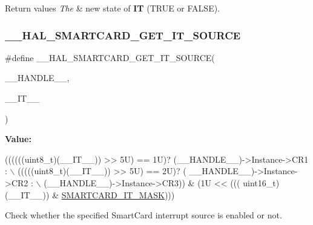 \begin{DoxyRetVals}{Return values}
{\em The} & new state of {\bfseries IT} (T\+R\+UE or F\+A\+L\+SE). \\
\hline
\end{DoxyRetVals}
\mbox{\label{group___s_m_a_r_t_c_a_r_d___exported___macros_ga8bae0fc7f068414790697698adafc4f2}} 
\subsubsection{\texorpdfstring{\+\_\+\+\_\+\+H\+A\+L\+\_\+\+S\+M\+A\+R\+T\+C\+A\+R\+D\+\_\+\+G\+E\+T\+\_\+\+I\+T\+\_\+\+S\+O\+U\+R\+CE}{\_\_HAL\_SMARTCARD\_GET\_IT\_SOURCE}}
{\footnotesize\ttfamily \#define \+\_\+\+\_\+\+H\+A\+L\+\_\+\+S\+M\+A\+R\+T\+C\+A\+R\+D\+\_\+\+G\+E\+T\+\_\+\+I\+T\+\_\+\+S\+O\+U\+R\+CE(\begin{DoxyParamCaption}\item[{}]{\+\_\+\+\_\+\+H\+A\+N\+D\+L\+E\+\_\+\+\_\+,  }\item[{}]{\+\_\+\+\_\+\+I\+T\+\_\+\+\_\+ }\end{DoxyParamCaption})}

{\bfseries Value\+:}
\begin{DoxyCode}
((((((uint8\_t)(\_\_IT\_\_)) >> 5U) == 1U)? (\_\_HANDLE\_\_)->Instance->CR1 : \(\backslash\)
                                                           (((((uint8\_t)(\_\_IT\_\_)) >> 5U) == 2U)? (
      \_\_HANDLE\_\_)->Instance->CR2 : \(\backslash\)
                                                           (\_\_HANDLE\_\_)->Instance->CR3)) & (1U << (((
      uint16\_t)(\_\_IT\_\_)) & \hyperlink{group___s_m_a_r_t_c_a_r_d___interruption___mask_ga2d4be8e0259fd370f82c53579c96ede5}{SMARTCARD\_IT\_MASK})))
\end{DoxyCode}


Check whether the specified Smart\+Card interrupt source is enabled or not. 


